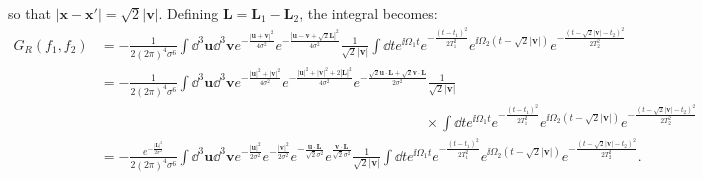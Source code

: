 so that $|\bm x - \bm x'| = \sqrt{2} |\bm v|$. Defining $\bm L = \bm L_1 - \bm L_2$, the integral becomes:{\footnotesize
\begin{align}
    G_R(f_1,f_2) & = -\frac{1}{2(2\pi)^4 \sigma^6} \int \dd^3\bm u \dd^3 \bm v e^{- \frac{|\bm u + \bm v|^2}{4\sigma^2}}e^{- \frac{|\bm u - \bm v + \sqrt{2}\bm L|^2}{4\sigma^2}}\frac{1}{\sqrt{2}|\bm v|} \int \dd t e^{\ii \Omega_1 t} e^{- \frac{(t-t_1)^2}{2T_1^2}}e^{\ii \Omega_2 (t - \sqrt{2}|\bm v|)} e^{- \frac{(t - \sqrt{2}|\bm v|-t_2)^2}{2T_2^2}}\\
    & = -\frac{1}{2(2\pi)^4 \sigma^6} \int   \dd^3\bm u \dd^3 \bm v e^{- \frac{|\bm u|^2 + |\bm v|^2}{4\sigma^2}}e^{- \frac{|\bm u|^2 +|\bm v|^2 + 2|\bm L|^2}{4\sigma^2}}e^{-\frac{\sqrt{2}\bm u\cdot \bm L + \sqrt{2}\bm v \cdot \bm L}{2\sigma^2}} \frac{1}{\sqrt{2}|\bm v|} \nonumber\\
    &\:\:\:\:\:\:\:\:\:\:\:\:\:\:\:\:\:\:\:\:\:\:\:\:\:\:\:\:\:\:\:\:\:\:\:\:\:\:\:\:\:\:\:\:\:\:\:\:\:\:\:\:\:\:\:\:\:\:\:\:\:\:\:\:\:\:\:\:\:\:\:\:\:\:\:\:\:\:\:\:\:\:\:\:\:\:\:\:\:\:\:\:\:\:\:\:\:\:\:\:\:\:\:\:\:\times\int \dd t e^{\ii \Omega_1 t} e^{- \frac{(t-t_1)^2}{2T_1^2}}e^{\ii \Omega_2 (t - \sqrt{2}|\bm v|)} e^{- \frac{(t - \sqrt{2}|\bm v|-t_2)^2}{2T_2^2}}\nonumber\\
    &= -\frac{e^{- \frac{|\bm L|^2}{2\sigma^2}}}{2(2\pi)^4 \sigma^6} \int   \dd^3\bm u \dd^3 \bm v e^{-\frac{|\bm u|^2}{2\sigma^2}}e^{-\frac{|\bm v|^2}{2\sigma^2}} e^{-\frac{\bm u\cdot \bm L}{\sqrt{2}\sigma^2}}e^{\frac{\bm v \cdot \bm L}{\sqrt{2}\sigma^2}}\frac{1}{\sqrt{2}|\bm v|} \int \dd t e^{\ii \Omega_1 t} e^{- \frac{(t-t_1)^2}{2T_1^2}}e^{\ii \Omega_2 (t - \sqrt{2}|\bm v|)} e^{- \frac{(t - \sqrt{2}|\bm v|-t_2)^2}{2T_2^2}}.\nonumber
\end{align}}
